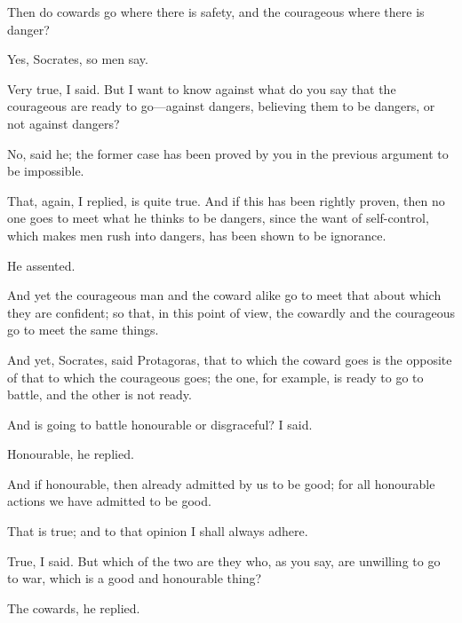 \documentclass[11pt,letter]{article}
\begin{document}
\par  Then do cowards go where there is safety, and the courageous where there is danger?

\par  Yes, Socrates, so men say.

\par  Very true, I said. But I want to know against what do you say that the courageous are ready to go—against dangers, believing them to be dangers, or not against dangers?

\par  No, said he; the former case has been proved by you in the previous argument to be impossible.

\par  That, again, I replied, is quite true. And if this has been rightly proven, then no one goes to meet what he thinks to be dangers, since the want of self-control, which makes men rush into dangers, has been shown to be ignorance.

\par  He assented.

\par  And yet the courageous man and the coward alike go to meet that about which they are confident; so that, in this point of view, the cowardly and the courageous go to meet the same things.

\par  And yet, Socrates, said Protagoras, that to which the coward goes is the opposite of that to which the courageous goes; the one, for example, is ready to go to battle, and the other is not ready.

\par  And is going to battle honourable or disgraceful? I said.

\par  Honourable, he replied.

\par  And if honourable, then already admitted by us to be good; for all honourable actions we have admitted to be good.

\par  That is true; and to that opinion I shall always adhere.

\par  True, I said. But which of the two are they who, as you say, are unwilling to go to war, which is a good and honourable thing?

\par  The cowards, he replied.
\end{document}
